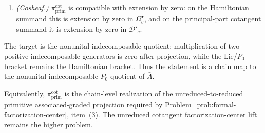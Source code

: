 \begin{thm}
\begin{enumerate}
	      target bracket
	      $\{B_f(a),\Theta_\rho(B)\}=\Theta_{f\cdot\rho}(aB)$ is given
	      separately by
	      Theorem~\ref{thm:reduced-principal-part-boundary-current};
	  \item \emph{(Cosheaf.)} $\pi_{\mathrm{prim}}^{\mathrm{cot}}$ is
	      compatible with extension by zero: on the Hamiltonian summand this
	      is extension by zero in \(\Omega^\bullet_c\), and on the
	      principal-part cotangent summand it is extension by zero in
	      \(\mathcal D'_c\).
  \end{enumerate}
		  The target is the nonunital indecomposable quotient: multiplication
		  of two positive indecomposable generators is zero after projection,
	  while the Lie/$P_0$ bracket remains the Hamiltonian bracket.  Thus
	  the statement is a chain map to the nonunital indecomposable
	  \(P_0\)-quotient of $\bar A$.

	  Equivalently, $\pi_{\mathrm{prim}}^{\mathrm{cot}}$ is the chain-level
	  realization of the unreduced-to-reduced primitive associated-graded projection required by
	  Problem~\ref{prob:formal-factorization-center}, item~(3). The
	  unreduced cotangent factorization-center lift remains the higher
	  problem.
\end{thm}

